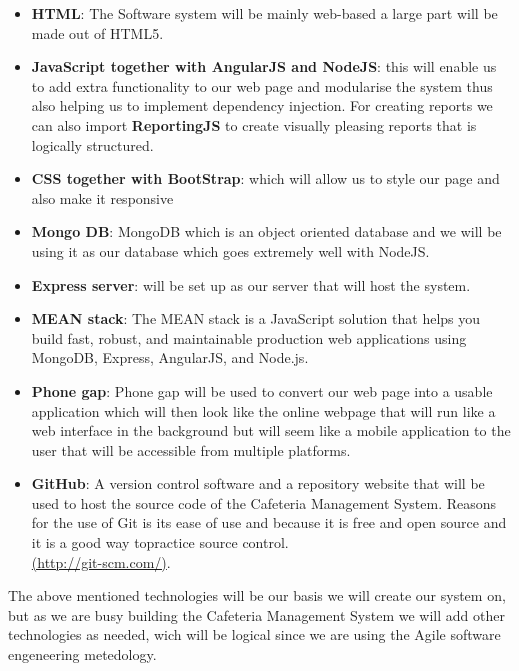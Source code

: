 \documentclass[a4paper,12pt]{article}
\begin{document}
\begin{itemize}
 \item \textbf{HTML}: The Software system will be mainly web-based a large part will be made out of HTML5.

 \item \textbf{JavaScript together with AngularJS  and NodeJS}: this will enable us to add extra functionality to our web page and modularise the system thus also helping us to implement dependency injection. For creating reports we can also import \textbf{ReportingJS} to create visually pleasing reports that is logically structured.

 \item \textbf{CSS together with BootStrap}: which will allow us to style our page and also make it responsive

 \item \textbf{Mongo DB}: MongoDB which is an object oriented database and we will be using it as our database which goes 	
extremely well with NodeJS. 

 \item \textbf{Express server}: will be set up as our server that will host the system.

\item \textbf{MEAN stack}: The MEAN stack is a JavaScript solution that helps you  build fast, robust, and maintainable 	 production web applications using  MongoDB, Express, AngularJS, and  Node.js.

 \item \textbf{Phone gap}: Phone gap will be used to convert our web page into a usable application which will then look like the online webpage that will run like a web interface in the background but  will seem like a mobile application to the user that will be accessible from multiple platforms.

\item \textbf{GitHub}: A version control software and a repository website that will be used to host the source code of the Cafeteria Management System. Reasons for the use of Git is its ease of use and because it is free and open source and it is a good way topractice source control.\\
 \url{(http://git-scm.com/)}.

\end{itemize}
The above mentioned technologies will be our basis we will create our system on, but as we are busy building the Cafeteria Management System we will add other technologies as needed, wich will be logical since we are using the Agile software engeneering metedology.
\end{document}
